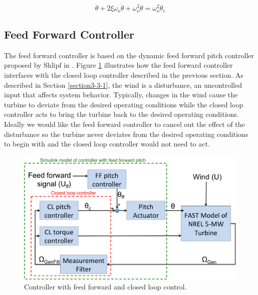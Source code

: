 \begin{equation}
	\ddot{\theta } + 2\xi \omega_o \dot{\theta} + \omega_{o}^{2}\theta = \omega_{o}^{2}\theta_c \label{eq3-1}
\end{equation}




\subsection{Feed Forward Controller} \label{section3-3-3}

The feed forward controller is based on the dynamic feed forward pitch controller proposed by Shlipf in \cite{schlipf2010}. Figure \ref{fig3-10} illustrates how the feed forward controller interfaces with the closed loop controller described in the previous section. As described in Section \ref{section3-3-1}, the wind is a disturbance, an uncontrolled input that affects system behavior. Typically, changes in the wind cause the turbine to deviate from the desired operating conditions while the closed loop controller acts to bring the turbine back to the desired operating conditions. Ideally we would like the feed forward controller to cancel out the effect of the disturbance so the turbine never deviates from the desired operating conditions to begin with and the closed loop controller would not need to act.

 \begin{figure}[htbp]
	\centering
		\includegraphics[width=\linewidth]{Figures/ch3Figures/fig3-10.png}
		
	\caption{Controller with feed forward and closed loop control.}
	\label{fig3-10}
\end{figure}

